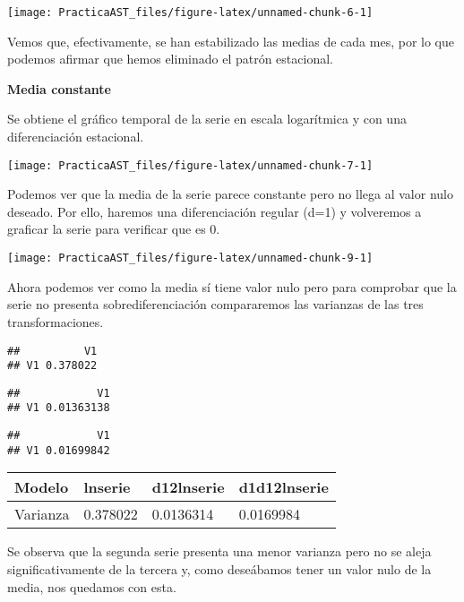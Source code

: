 \documentclass[
]{article}
\begin{document}
\begin{center}\texttt{[image: PracticaAST\_files/figure-latex/unnamed-chunk-6-1]} \end{center}

Vemos que, efectivamente, se han estabilizado las medias de cada mes,
por lo que podemos afirmar que hemos eliminado el patrón estacional.

\medskip

\textbf{Media constante}

Se obtiene el gráfico temporal de la serie en escala logarítmica y con
una diferenciación estacional.

\begin{center}\texttt{[image: PracticaAST\_files/figure-latex/unnamed-chunk-7-1]} \end{center}

Podemos ver que la media de la serie parece constante pero no llega al
valor nulo deseado. Por ello, haremos una diferenciación regular (d=1) y
volveremos a graficar la serie para verificar que es 0.

\begin{center}\texttt{[image: PracticaAST\_files/figure-latex/unnamed-chunk-9-1]} \end{center}

Ahora podemos ver como la media sí tiene valor nulo pero para comprobar
que la serie no presenta sobrediferenciación compararemos las varianzas
de las tres transformaciones.

\begin{verbatim}
##          V1
## V1 0.378022
\end{verbatim}

\begin{verbatim}
##            V1
## V1 0.01363138
\end{verbatim}

\begin{verbatim}
##            V1
## V1 0.01699842
\end{verbatim}

\begin{longtable}[]{@{}llll@{}}
\toprule()
Modelo & lnserie & d12lnserie & d1d12lnserie \\
\midrule()
\endhead
Varianza & 0.378022 & 0.0136314 & 0.0169984 \\
\bottomrule()
\end{longtable}

Se observa que la segunda serie presenta una menor varianza pero no se
aleja significativamente de la tercera y, como deseábamos tener un valor
nulo de la media, nos quedamos con esta.
\end{document}
